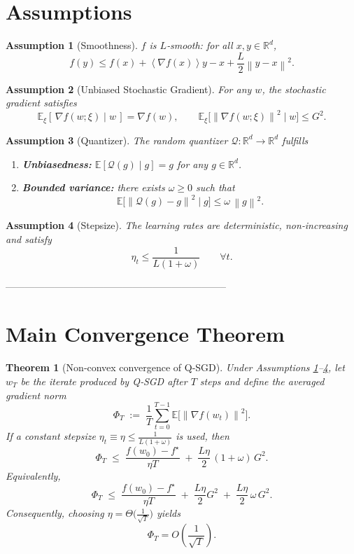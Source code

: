 \documentclass{article}
\newtheorem{theorem}{Theorem}
\newtheorem{assumption}{Assumption}
\newcommand{\E}{\mathbb{E}}
\newcommand{\norm}[1]{\left\|#1\right\|}
\newcommand{\inner}[1]{\left\langle #1\right\rangle}
\newcommand{\Q}{\mathcal{Q}}
\begin{document}
\section*{Assumptions}
\begin{assumption}[Smoothness]\label{ass:smooth}
$f$ is $L$‑smooth: for all $x,y\in\mathbb{R}^d$,
\[
f(y)\le f(x)+\inner{\nabla f(x)}{y-x}+\frac{L}{2}\norm{y-x}^2 .
\]
\end{assumption}
\begin{assumption}[Unbiased Stochastic Gradient]\label{ass:unbiased}
For any $w$, the stochastic gradient satisfies
\[
\E_{\xi}[\,\nabla f(w;\xi)\mid w\,]=\nabla f(w),\qquad
\E_{\xi}\!\big[\norm{\nabla f(w;\xi)}^2\mid w\big]\le G^2 .
\]
\end{assumption}
\begin{assumption}[Quantizer]\label{ass:quant}
The random quantizer $\Q:\mathbb{R}^d\to\mathbb{R}^d$ fulfills
\begin{enumerate}[label=(\roman*)]
\item \textbf{Unbiasedness:} $\E[\Q(g)\mid g]=g$ for any $g\in\mathbb{R}^d$.
\item \textbf{Bounded variance:} there exists $\omega\ge0$ such that
\[
\E\!\big[\norm{\Q(g)-g}^2\mid g\big]\le\omega\,\norm{g}^2 .
\]
\end{enumerate}
\end{assumption}
\begin{assumption}[Stepsize]\label{ass:stepsize}
The learning rates are deterministic, non‑increasing and satisfy
\[
\eta_t\le \frac{1}{L(1+\omega)}\qquad\forall t .
\]
\end{assumption}

--------------------------------------------------------------------

\section*{Main Convergence Theorem}
\begin{theorem}[Non‑convex convergence of Q‑SGD]\label{thm:main}
Under Assumptions \ref{ass:smooth}–\ref{ass:stepsize}, let $w_T$ be the iterate produced by Q‑SGD after $T$ steps and define the averaged gradient norm
\[
\Phi_T\;:=\;\frac{1}{T}\sum_{t=0}^{T-1}\E\big[\norm{\nabla f(w_t)}^2\big].
\]
If a constant stepsize $\eta_t\equiv\eta\le\frac{1}{L(1+\omega)}$ is used, then
\[
\Phi_T\;\le\;
\frac{f(w_0)-f^\star}{\eta T}
\;+\;
\frac{L\eta}{2}\,(1+\omega)\,G^2 .
\tag{1}
\]
Equivalently,
\[
\Phi_T\;\le\;
\frac{f(w_0)-f^\star}{\eta T}
\;+\;
\frac{L\eta}{2}G^2
\;+\;
\frac{L\eta}{2}\,\omega\,G^2 .
\tag{1$'$}
\]
Consequently, choosing $\eta=\Theta\!\big(\frac{1}{\sqrt{T}}\big)$ yields
\[
\Phi_T = O\!\left(\frac{1}{\sqrt{T}}\right).
\]
\end{theorem}
\end{document}
